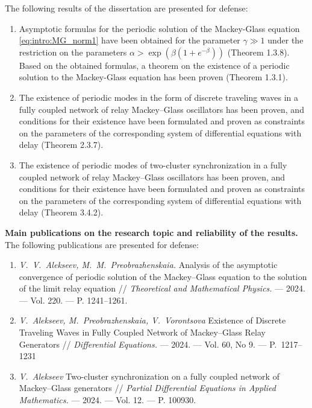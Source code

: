 {} The following results of the dissertation are presented for defense:
\begin{enumerate}[beginpenalty=10000] %
	\item Asymptotic formulas for the periodic solution of the Mackey-Glass equation \eqref{eq:intro:MG_norm1} have been obtained for the parameter $\gamma \gg 1$ under the restriction on the parameters $\alpha > \exp\left(\beta(1 + e^{-\beta})\right)$ (Theorem 1.3.8). Based on the obtained formulas, a theorem on the existence of a periodic solution to the Mackey-Glass equation has been proven (Theorem 1.3.1).
	\item The existence of periodic modes in the form of discrete traveling waves in a fully coupled network of relay Mackey--Glass oscillators has been proven, and conditions for their existence have been formulated and proven as constraints on the parameters of the corresponding system of differential equations with delay (Theorem 2.3.7).
	\item The existence of periodic modes of two-cluster synchronization in a fully coupled network of relay Mackey--Glass oscillators has been proven, and conditions for their existence have been formulated and proven as constraints on the parameters of the corresponding system of differential equations with delay (Theorem 3.4.2).
\end{enumerate}

\bigskip

\textbf{Main publications on the research topic and reliability of the results.} The following publications are presented for defense:
\begin{enumerate}
	\item \emph{V.~V.~Alekseev, M.~M.~Preobrazhenskaia.} Analysis of the asymptotic convergence of periodic solution of the Mackey–Glass equation to the solution of the limit relay equation // \emph{Theoretical and Mathematical Physics.} --- 2024. --- Vol. 220. --- P. 1241--1261. \cite{wosbib1}
	\item \emph{V.~Alekseev, M.~Preobrazhenskaia, V.~Vorontsova} Existence of Discrete Traveling Waves in Fully Coupled Network of Mackey--Glass Relay Generators // \emph{Differential Equations.} --- 2024. --- Vol. 60, No 9. --- P.~1217--1231 \cite{wosbib2}
	\item \emph{V.~Alekseev} Two-cluster synchronization on a fully coupled network of Mackey--Glass generators // \emph{Partial Differential Equations in Applied Mathematics.} --- 2024. --- Vol. 12. --- P. 100930. \cite{scbib1}
\end{enumerate}

